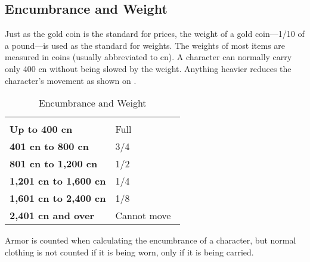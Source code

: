 \begin{multicols*}{2}
\section{Encumbrance and Weight}\label{sec:Encumbrance and Weight}
Just as the gold coin is the standard for prices, the weight of a gold coin—1/10 of a pound—is used as the standard for weights. The weights of most items are measured in coins (usually abbreviated to cn). A character can normally carry only 400 cn without being slowed by the weight. Anything heavier reduces the character’s movement as shown on .

\begin {table}[H]
	\caption{Encumbrance and Weight}\label{tab:Encumbrance and Weight}
	\begin{tabularx}{\columnwidth}{>{\bfseries}YY}
		 & \\
		Up to 400 cn & Full\\
		401 cn to 800 cn & 3/4\\
		801 cn to 1,200 cn & 1/2\\
		1,201 cn to 1,600 cn & 1/4\\
		1,601 cn to 2,400 cn & 1/8\\
		2,401 cn and over & Cannot move\
  \end {tabularx}
\end {table}
Armor is counted when calculating the encumbrance of a character, but normal clothing is not counted if it is being worn, only if it is being carried.


\end{multicols*}

